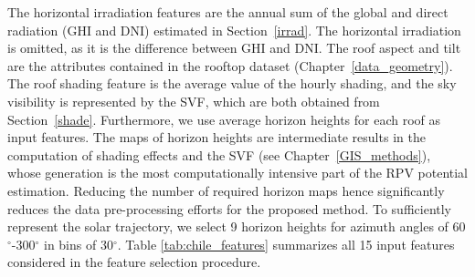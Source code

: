 The horizontal irradiation features are the annual sum of the global and direct radiation (GHI and DNI) estimated in Section~\ref{irrad}. The horizontal irradiation is omitted, as it is the difference between GHI and DNI.
The roof aspect and tilt are the attributes contained in the rooftop dataset (Chapter~\ref{data_geometry}). 
The roof shading feature is the average value of the hourly shading, and the sky visibility is represented by the SVF, which are both obtained from Section~\ref{shade}.
Furthermore, we use average horizon heights for each roof as input features. 
The maps of horizon heights are intermediate results in the computation of shading effects and the SVF (see Chapter~\ref{GIS_methods}), whose generation is the most computationally intensive part of the RPV potential estimation. Reducing the number of required horizon maps hence significantly reduces the data pre-processing efforts for the proposed method.
To sufficiently represent the solar trajectory, we select 9 horizon heights for azimuth angles of 60$^\circ$-300$^\circ$ in bins of 30$^\circ$. 
Table \ref{tab:chile_features} summarizes all 15 input features considered in the feature selection procedure.

